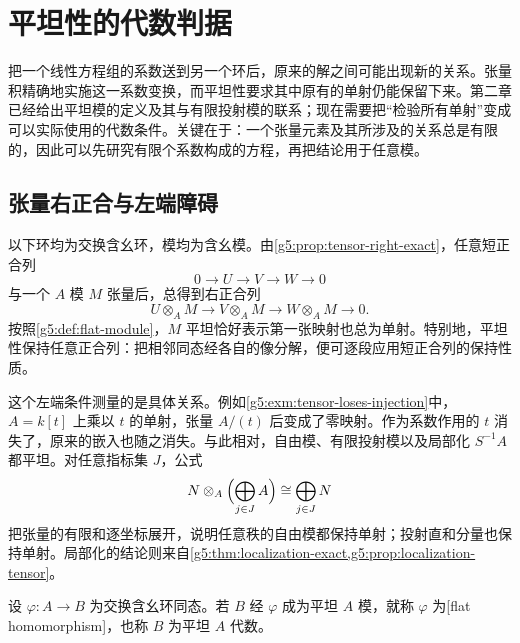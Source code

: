 
% 
% 

\section{平坦性的代数判据}
\label{g5:sec:0601}

把一个线性方程组的系数送到另一个环后，原来的解之间可能出现新的关系。张量积精确地实施这一系数变换，而平坦性要求其中原有的单射仍能保留下来。第二章已经给出平坦模的定义及其与有限投射模的联系；现在需要把“检验所有单射”变成可以实际使用的代数条件。关键在于：一个张量元素及其所涉及的关系总是有限的，因此可以先研究有限个系数构成的方程，再把结论用于任意模。

\subsection{张量右正合与左端障碍}
\label{g5:subsec:0601:01}

以下环均为交换含幺环，模均为含幺模。由\cref{g5:prop:tensor-right-exact}，任意短正合列
\[
	0\longrightarrow U\longrightarrow V\longrightarrow W\longrightarrow0
\]
与一个 \(A\) 模 \(M\) 张量后，总得到右正合列
\[
	U\otimes_A M\longrightarrow V\otimes_A M
	\longrightarrow W\otimes_A M\longrightarrow0.
\]
按照\cref{g5:def:flat-module}，\(M\) 平坦恰好表示第一张映射也总为单射。特别地，平坦性保持任意正合列：把相邻同态经各自的像分解，便可逐段应用短正合列的保持性质。

\ProseParagraphBreak

这个左端条件测量的是具体关系。例如\cref{g5:exm:tensor-loses-injection}中，\(A=k[t]\) 上乘以 \(t\) 的单射，张量 \(A/(t)\) 后变成了零映射。作为系数作用的 \(t\) 消失了，原来的嵌入也随之消失。与此相对，自由模、有限投射模以及局部化 \(S^{-1}A\) 都平坦。对任意指标集 \(J\)，公式
\[
	N\otimes_A\Bigl(\bigoplus_{j\in J}A\Bigr)
	\cong\bigoplus_{j\in J}N
\]
把张量的有限和逐坐标展开，说明任意秩的自由模都保持单射；投射直和分量也保持单射。局部化的结论则来自\cref{g5:thm:localization-exact,g5:prop:localization-tensor}。

\begin{definition}\label{g5:def:flat-homomorphism}
	设 \(\varphi:A\to B\) 为交换含幺环同态。若 \(B\) 经 \(\varphi\) 成为平坦 \(A\) 模，就称 \(\varphi\) 为[flat homomorphism]，也称 \(B\) 为平坦 \(A\) 代数。
\end{definition}

